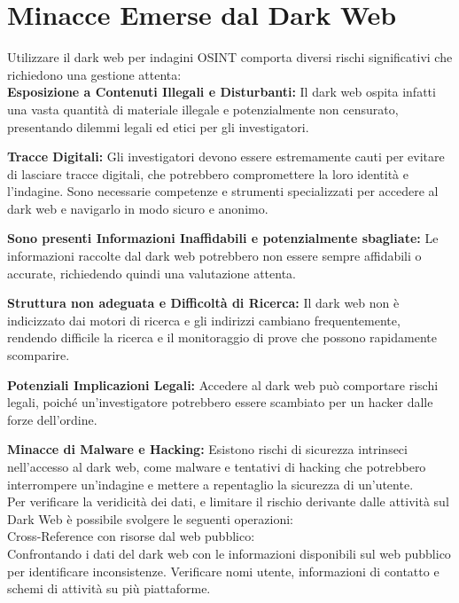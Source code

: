 \section{Minacce Emerse dal Dark Web}\label{sec:cap_sec_impl6}

Utilizzare il dark web per indagini OSINT comporta diversi rischi significativi che richiedono una gestione attenta:\\

\textbf{Esposizione a Contenuti Illegali e Disturbanti:} Il dark web ospita infatti una vasta quantità di materiale illegale e potenzialmente non censurato, presentando dilemmi legali ed etici per gli investigatori.

\textbf{Tracce Digitali:} Gli investigatori devono essere estremamente cauti per evitare di lasciare tracce digitali, che potrebbero compromettere la loro identità e l'indagine. Sono necessarie competenze e strumenti specializzati per accedere al dark web e navigarlo in modo sicuro e anonimo.

\textbf{Sono presenti Informazioni Inaffidabili e potenzialmente sbagliate:} Le informazioni raccolte dal dark web potrebbero non essere sempre affidabili o accurate, richiedendo quindi una valutazione attenta.

\textbf{Struttura non adeguata e Difficoltà di Ricerca:} Il dark web non è indicizzato dai motori di ricerca e gli indirizzi cambiano frequentemente, rendendo difficile la ricerca e il monitoraggio di prove che possono rapidamente scomparire.

\textbf{Potenziali Implicazioni Legali:} Accedere al dark web può comportare rischi legali, poiché un'investigatore potrebbero essere scambiato per un hacker dalle forze dell'ordine.

\textbf{Minacce di Malware e Hacking:} Esistono rischi di sicurezza intrinseci nell'accesso al dark web, come malware e tentativi di hacking che potrebbero interrompere un'indagine e mettere a repentaglio la sicurezza di un'utente.\\

\medskip
\medskip
Per verificare la veridicità dei dati, e limitare il rischio derivante dalle attività sul Dark Web è possibile svolgere le seguenti operazioni:\\

Cross-Reference con risorse dal web pubblico:
\\Confrontando i dati del dark web con le informazioni disponibili sul web pubblico per identificare inconsistenze.
Verificare nomi utente, informazioni di contatto e schemi di attività su più piattaforme.\\

